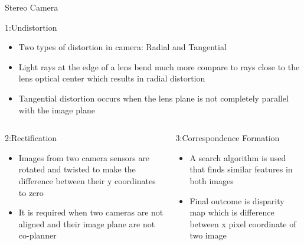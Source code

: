 \documentclass[10pt]{beamer}
\begin{document}
\begin{frame}{Stereo Camera}
   \begin{block}{1:Undistortion}
     \begin{itemize}
         \item Two types of distortion in camera: Radial and Tangential
         \item Light rays at the edge of a lens bend much more compare to rays close to the lens optical center which results in radial distortion
         \item Tangential distortion occurs when the lens plane is not completely parallel with the image plane 
     \end{itemize}
   \end{block}
   
   \begin{columns}
   \begin{block}{2:Rectification}
       \begin{itemize}
           \item Images from two camera sensors are rotated and twisted to make the difference between their y coordinates to zero
           \item It is required when two cameras are not aligned and their image plane are not co-planner
       \end{itemize}
   \end{block}
   \begin{block}{3:Correspondence Formation}
       \begin{itemize}
           \item A search algorithm is used that finds similar features in both images
           \item Final outcome is disparity map which is difference between x pixel coordinate of two image
       \end{itemize}
   \end{block}
\end{columns}
\end{frame}
\end{document}
